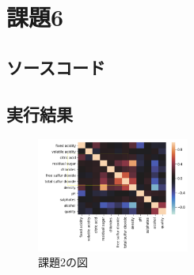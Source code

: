 \documentclass[a4paper,11pt,titlepage]{bxjsarticle}
\begin{document}
\section{課題6}
\subsection{ソースコード}

\subsection{実行結果}
\begin{figure}[htbp]
 \begin{center}
  \includegraphics[width=50mm]{sample2.png}
 \end{center}
 \caption{課題2の図}
 \label{fig:one}
\end{figure}
\end{document}
